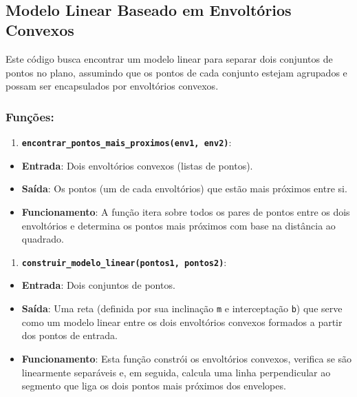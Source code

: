 \documentclass[11pt]{article}
\providecommand{\tightlist}{%
      \setlength{\itemsep}{0pt}\setlength{\parskip}{0pt}}
\begin{document}
    \begin{center}
    \end{center}
    { \hspace*{\fill} \\}
    
    \hypertarget{modelo-linear-baseado-em-envoltuxf3rios-convexos}{%
\subsection{Modelo Linear Baseado em Envoltórios
Convexos}\label{modelo-linear-baseado-em-envoltuxf3rios-convexos}}

Este código busca encontrar um modelo linear para separar dois conjuntos
de pontos no plano, assumindo que os pontos de cada conjunto estejam
agrupados e possam ser encapsulados por envoltórios convexos.

\hypertarget{funuxe7uxf5es}{%
\subsubsection{Funções:}\label{funuxe7uxf5es}}

\begin{enumerate}
\def\labelenumi{\arabic{enumi}.}
\tightlist
\item
  \textbf{\texttt{encontrar\_pontos\_mais\_proximos(env1,\ env2)}}:
\end{enumerate}

\begin{itemize}
\tightlist
\item
  \textbf{Entrada}: Dois envoltórios convexos (listas de pontos).
\item
  \textbf{Saída}: Os pontos (um de cada envoltórios) que estão mais
  próximos entre si.
\item
  \textbf{Funcionamento}: A função itera sobre todos os pares de pontos
  entre os dois envoltórios e determina os pontos mais próximos com base
  na distância ao quadrado.
\end{itemize}

\begin{enumerate}
\def\labelenumi{\arabic{enumi}.}
\setcounter{enumi}{1}
\tightlist
\item
  \textbf{\texttt{construir\_modelo\_linear(pontos1,\ pontos2)}}:
\end{enumerate}

\begin{itemize}
\tightlist
\item
  \textbf{Entrada}: Dois conjuntos de pontos.
\item
  \textbf{Saída}: Uma reta (definida por sua inclinação \texttt{m} e
  interceptação \texttt{b}) que serve como um modelo linear entre os
  dois envoltórios convexos formados a partir dos pontos de entrada.
\item
  \textbf{Funcionamento}: Esta função constrói os envoltórios convexos,
  verifica se são linearmente separáveis e, em seguida, calcula uma
  linha perpendicular ao segmento que liga os dois pontos mais próximos
  dos envelopes.
\end{itemize}
\end{document}
